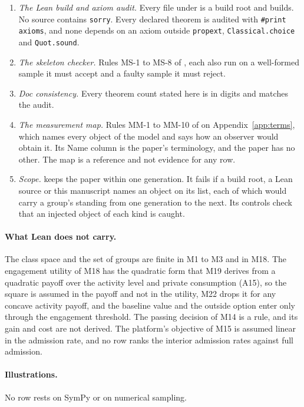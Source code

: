 \begin{enumerate}
\item \emph{The Lean build and axiom audit.} Every file under
 is a build root and builds. No source contains
\texttt{sorry}. Every declared theorem is audited with \texttt{\#print axioms},
and none depends on an axiom outside \texttt{propext},
\texttt{Classical.choice} and \texttt{Quot.sound}.
\item \emph{The skeleton checker.} Rules MS-1 to MS-8 of
, each also run on a well-formed sample it
must accept and a faulty sample it must reject.
\item \emph{Doc consistency.} Every theorem count stated here is in digits and
matches the audit.
\item \emph{The measurement map.} Rules MM-1 to MM-10 of
 on Appendix~\ref{app:terms}, which
names every object of the model and says how an observer would obtain it.
Its Name column is the paper's terminology, and the paper has no other.
The map is a reference and not evidence for any row.
\item \emph{Scope.}  keeps the paper within
one generation. It fails if a build root, a Lean source or this
manuscript names an object on its list, each of which would carry a
group's standing from one generation to the next. Its controls check that an
injected object of each kind is caught.
\end{enumerate}

\paragraph{What Lean does not carry.} The class space and the set of groups
are finite in M1 to M3 and in M18. The engagement utility of M18 has the
quadratic form that M19 derives from a quadratic payoff over the activity
level and private consumption (A15), so the square is assumed in the payoff
and not in the utility, M22 drops it for any concave activity payoff, and the baseline value and the
outside option enter only through the engagement threshold.
The passing decision of M14 is a rule, and its gain and cost are not
derived. The platform's objective of M15 is
assumed linear in the admission rate, and no row ranks
the interior admission rates against full admission.

\paragraph{Illustrations.} No row rests on SymPy or on numerical sampling.

